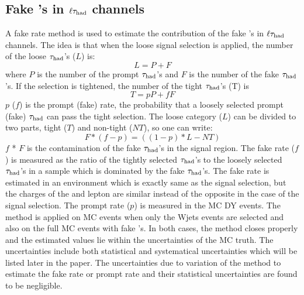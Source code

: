 \subsection{\texorpdfstring{Fake \Tau's in $\ell\tau_{\rm had}$ channels}{Fake Taus in Lepton-Tau Channels}}
A fake rate method is used to estimate the contribution of the fake \Tau's in $\ell\tau_{\rm had}$ channels. 
The idea is that when the loose signal selection is applied, the number of the loose $\tau_{\rm had}$'s ($L$) is:
\begin{equation}
L = P + F
\end{equation}
where $P$ is the number of the  prompt $\tau_{\rm had}$'s and $F$ is the number of the  fake $\tau_{\rm had}$'s. If the selection is tightened, the number of the tight $\tau_{\rm had}$'s (T) is
\begin{equation}
 T = pP + fF
\end{equation} 
$p$ ($f$) is the prompt (fake) rate, the probability that a loosely selected prompt (fake) $\tau_{\rm had}$ can pass the  tight  selection. The loose category ($L$) can be divided to two parts, 
tight ($T$) and non-tight ($NT$), so one can write:
\begin{equation}
   F * (f - p) = ((1 - p) * L - NT)
\end{equation}
$f$ * $F$ is the contamination of the fake $\tau_{\rm had}$'s in the signal region. 
The fake rate ($f$) is measured as the ratio of the tightly selected $\tau_{\rm had}$'s to the loosely 
selected $\tau_{\rm had}$'s in a sample which is dominated by the fake $\tau_{\rm had}$'s. The fake rate is estimated in an environment which is exactly 
same as the signal selection, but the charges of the \Tau and lepton are similar instead of the opposite in the case of the signal selection.
The prompt rate ($p$) is measured in the MC DY events. The method is applied on MC events when only the Wjets events are selected and 
also on the full MC events with fake \Tau's. In both cases, the method closes properly and the estimated values lie within 
the uncertainties of the MC truth. The uncertainties include both statistical and systematical uncertainties which will be listed later in 
the paper. The uncertainties due to variation of the method to estimate the fake rate or prompt rate and their statistical uncertainties 
are found to be negligible.


